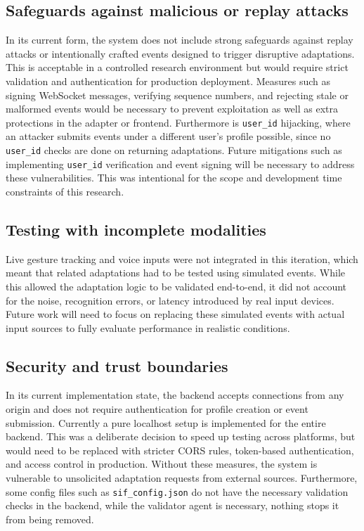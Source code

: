 \documentclass[openany]{book}
\begin{document}
\subsection{Safeguards against malicious or replay attacks}
In its current form, the system does not include strong safeguards against replay attacks or intentionally crafted events designed to trigger disruptive adaptations. This is acceptable in a controlled research environment but would require strict validation and authentication for production deployment. Measures such as signing WebSocket messages, verifying sequence numbers, and rejecting stale or malformed events would be necessary to prevent exploitation as well as extra protections in the adapter or frontend. Furthermore is \texttt{user\_id} hijacking, where an attacker submits events under a different user’s profile possible, since no \texttt{user\_id} checks are done on returning adaptations. Future mitigations such as implementing \texttt{user\_id} verification and event signing will be necessary to address these vulnerabilities. This was intentional for the scope and development time constraints of this research.

\subsection{Testing with incomplete modalities}
Live gesture tracking and voice inputs were not integrated in this iteration, which meant that related adaptations had to be tested using simulated events. While this allowed the adaptation logic to be validated end-to-end, it did not account for the noise, recognition errors, or latency introduced by real input devices. Future work will need to focus on replacing these simulated events with actual input sources to fully evaluate performance in realistic conditions.

\subsection{Security and trust boundaries}
In its current implementation state, the backend accepts connections from any origin and does not require authentication for profile creation or event submission. Currently a pure localhost setup is implemented for the entire backend. This was a deliberate decision to speed up testing across platforms, but would need to be replaced with stricter CORS rules, token-based authentication, and access control in production. Without these measures, the system is vulnerable to unsolicited adaptation requests from external sources. Furthermore, some config files such as \texttt{sif\_config.json} do not have the necessary validation checks in the backend, while the validator agent is necessary, nothing stops it from being removed.
\end{document}
